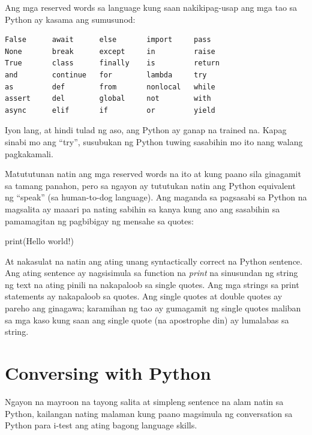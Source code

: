 \documentclass[10pt,]{book}
\newenvironment{Shaded}{}{}
\newcommand{\BuiltInTok}[1]{\textcolor[rgb]{0.00,0.50,0.00}{#1}}
\newcommand{\NormalTok}[1]{#1}
\newcommand{\StringTok}[1]{\textcolor[rgb]{0.25,0.44,0.63}{#1}}
\begin{document}
Ang mga reserved words sa language kung saan nakikipag-usap ang mga tao
sa Python ay kasama ang sumusunod:

{\small
\begin{verbatim}
False      await      else       import     pass
None       break      except     in         raise
True       class      finally    is         return
and        continue   for        lambda     try
as         def        from       nonlocal   while
assert     del        global     not        with
async      elif       if         or         yield
\end{verbatim}
}

Iyon lang, at hindi tulad ng aso, ang Python ay ganap na trained na.
Kapag sinabi mo ang ``try'', susubukan ng Python tuwing sasabihin mo ito
nang walang pagkakamali.

Matututunan natin ang mga reserved words na ito at kung paano sila
ginagamit sa tamang panahon, pero sa ngayon ay tututukan natin ang
Python equivalent ng ``speak'' (sa human-to-dog language). Ang maganda
sa pagsasabi sa Python na magsalita ay maaari pa nating sabihin sa kanya
kung ano ang sasabihin sa pamamagitan ng pagbibigay ng mensahe sa
quotes:

\begin{Shaded}
\begin{Highlighting}[]
\BuiltInTok{print}\NormalTok{(}\StringTok{\textquotesingle{}Hello world!\textquotesingle{}}\NormalTok{)}
\end{Highlighting}
\end{Shaded}

At nakasulat na natin ang ating unang syntactically correct na Python
sentence. Ang ating sentence ay nagsisimula sa function na \emph{print}
na sinusundan ng string ng text na ating pinili na nakapaloob sa single
quotes. Ang mga strings sa print statements ay nakapaloob sa quotes. Ang
single quotes at double quotes ay pareho ang ginagawa; karamihan ng tao
ay gumagamit ng single quotes maliban sa mga kaso kung saan ang single
quote (na apostrophe din) ay lumalabas sa string.

\section{Conversing with Python}\label{conversing-with-python}

Ngayon na mayroon na tayong salita at simpleng sentence na alam natin sa
Python, kailangan nating malaman kung paano magsimula ng conversation sa
Python para i-test ang ating bagong language skills.
\end{document}
